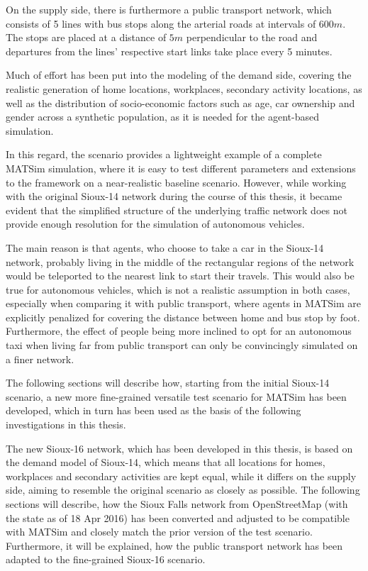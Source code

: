 On the supply side, there is furthermore a public transport network, which
consists of 5 lines with bus stops along the arterial roads at intervals of $600m$.
The stops are placed at a distance of $5m$ perpendicular to the road and departures
from the lines' respective start links take place every 5 minutes.

Much of effort has been put into the modeling of the demand side, covering the
realistic generation of home locations, workplaces, secondary activity locations,
as well as the distribution of socio-economic factors such as age, car ownership
and gender across a synthetic population, as it is needed for the agent-based
simulation.

In this regard, the scenario provides a lightweight example of a complete MATSim
simulation, where it is easy to test different parameters and extensions to the
framework on a near-realistic baseline scenario. However, while working with the
original Sioux-14 network during the course of this thesis, it became evident that
the simplified structure of the underlying traffic network does not provide enough
resolution for the simulation of autonomous vehicles.

The main reason is that agents, who choose to take a car in the Sioux-14 network,
probably living in the middle of the rectangular regions of the network would be
teleported to the nearest link to start their travels. This would also be true
for autonomous vehicles, which is not a realistic assumption in both cases, especially
when comparing it with public transport, where agents in MATSim are explicitly
penalized for covering the distance between home and bus stop by foot.
Furthermore, the effect of people being more inclined to opt for an autonomous taxi
when living far from public transport can only be convincingly simulated on a
finer network.

The following sections will describe how, starting from the initial Sioux-14
scenario, a new more fine-grained versatile test scenario for MATSim has been
developed, which in turn has been used as the basis of the following investigations in this
thesis.

The new Sioux-16 network, which has been developed in this thesis, is based on the
demand model of Sioux-14, which means that all locations for homes, workplaces and
secondary activities are kept equal, while it differs on the supply side, aiming
to resemble the original scenario as closely as possible. The following sections
will describe, how the Sioux Falls network from OpenStreetMap (with the state
as of 18 Apr 2016) has been converted and adjusted to be compatible with MATSim
and closely match the prior version of the test scenario. Furthermore, it will
be explained, how the public transport network has been adapted to the fine-grained
Sioux-16 scenario.

